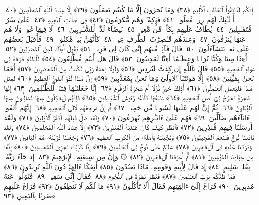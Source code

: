  إِنَّكُم لَذَآئِقُوا۟ ٱلعَذَابِ ٱلأَلِيمِ ﴿٣٨﴾
 وَمَا تُجزَونَ إِلَّا مَا كُنتُم تَعمَلُونَ ﴿٣٩﴾
 إِلَّا عِبَادَ ٱللَّهِ ٱلمُخلَصِينَ ﴿٤٠﴾
 أُو۟لَـٰٓئِكَ لَهُم رِزقٌۭ مَّعلُومٌۭ ﴿٤١﴾
 فَوَٟكِهُ ۖ وَهُم مُّكرَمُونَ ﴿٤٢﴾
 فِى جَنَّـٰتِ ٱلنَّعِيمِ ﴿٤٣﴾
 عَلَىٰ سُرُرٍۢ مُّتَقَـٰبِلِينَ ﴿٤٤﴾
 يُطَافُ عَلَيهِم بِكَأسٍۢ مِّن مَّعِينٍۭ ﴿٤٥﴾
 بَيضَآءَ لَذَّةٍۢ لِّلشَّـٰرِبِينَ ﴿٤٦﴾
 لَا فِيهَا غَولٌۭ وَلَا هُم عَنهَا يُنزَفُونَ ﴿٤٧﴾
 وَعِندَهُم قَـٰصِرَٰتُ ٱلطَّرفِ عِينٌۭ ﴿٤٨﴾
 كَأَنَّهُنَّ بَيضٌۭ مَّكنُونٌۭ ﴿٤٩﴾
 فَأَقبَلَ بَعضُهُم عَلَىٰ بَعضٍۢ يَتَسَآءَلُونَ ﴿٥٠﴾
 قَالَ قَآئِلٌۭ مِّنهُم إِنِّى كَانَ لِى قَرِينٌۭ ﴿٥١﴾
 يَقُولُ أَءِنَّكَ لَمِنَ ٱلمُصَدِّقِينَ ﴿٥٢﴾
 أَءِذَا مِتنَا وَكُنَّا تُرَابًۭا وَعِظَـٰمًا أَءِنَّا لَمَدِينُونَ ﴿٥٣﴾
 قَالَ هَل أَنتُم مُّطَّلِعُونَ ﴿٥٤﴾
 فَٱطَّلَعَ فَرَءَاهُ فِى سَوَآءِ ٱلجَحِيمِ ﴿٥٥﴾
 قَالَ تَٱللَّهِ إِن كِدتَّ لَتُردِينِ ﴿٥٦﴾
 وَلَولَا نِعمَةُ رَبِّى لَكُنتُ مِنَ ٱلمُحضَرِينَ ﴿٥٧﴾
 أَفَمَا نَحنُ بِمَيِّتِينَ ﴿٥٨﴾
 إِلَّا مَوتَتَنَا ٱلأُولَىٰ وَمَا نَحنُ بِمُعَذَّبِينَ ﴿٥٩﴾
 إِنَّ هَـٰذَا لَهُوَ ٱلفَوزُ ٱلعَظِيمُ ﴿٦٠﴾
 لِمِثلِ هَـٰذَا فَليَعمَلِ ٱلعَـٰمِلُونَ ﴿٦١﴾
 أَذَٟلِكَ خَيرٌۭ نُّزُلًا أَم شَجَرَةُ ٱلزَّقُّومِ ﴿٦٢﴾
 إِنَّا جَعَلنَـٰهَا فِتنَةًۭ لِّلظَّـٰلِمِينَ ﴿٦٣﴾
 إِنَّهَا شَجَرَةٌۭ تَخرُجُ فِىٓ أَصلِ ٱلجَحِيمِ ﴿٦٤﴾
 طَلعُهَا كَأَنَّهُۥ رُءُوسُ ٱلشَّيَـٰطِينِ ﴿٦٥﴾
 فَإِنَّهُم لَءَاكِلُونَ مِنهَا فَمَالِـُٔونَ مِنهَا ٱلبُطُونَ ﴿٦٦﴾
 ثُمَّ إِنَّ لَهُم عَلَيهَا لَشَوبًۭا مِّن حَمِيمٍۢ ﴿٦٧﴾
 ثُمَّ إِنَّ مَرجِعَهُم لَإِلَى ٱلجَحِيمِ ﴿٦٨﴾
 إِنَّهُم أَلفَوا۟ ءَابَآءَهُم ضَآلِّينَ ﴿٦٩﴾
 فَهُم عَلَىٰٓ ءَاثَـٰرِهِم يُهرَعُونَ ﴿٧٠﴾
 وَلَقَد ضَلَّ قَبلَهُم أَكثَرُ ٱلأَوَّلِينَ ﴿٧١﴾
 وَلَقَد أَرسَلنَا فِيهِم مُّنذِرِينَ ﴿٧٢﴾
 فَٱنظُر كَيفَ كَانَ عَـٰقِبَةُ ٱلمُنذَرِينَ ﴿٧٣﴾
 إِلَّا عِبَادَ ٱللَّهِ ٱلمُخلَصِينَ ﴿٧٤﴾
 وَلَقَد نَادَىٰنَا نُوحٌۭ فَلَنِعمَ ٱلمُجِيبُونَ ﴿٧٥﴾
 وَنَجَّينَـٰهُ وَأَهلَهُۥ مِنَ ٱلكَربِ ٱلعَظِيمِ ﴿٧٦﴾
 وَجَعَلنَا ذُرِّيَّتَهُۥ هُمُ ٱلبَاقِينَ ﴿٧٧﴾
 وَتَرَكنَا عَلَيهِ فِى ٱلءَاخِرِينَ ﴿٧٨﴾
 سَلَـٰمٌ عَلَىٰ نُوحٍۢ فِى ٱلعَـٰلَمِينَ ﴿٧٩﴾
 إِنَّا كَذَٟلِكَ نَجزِى ٱلمُحسِنِينَ ﴿٨٠﴾
 إِنَّهُۥ مِن عِبَادِنَا ٱلمُؤمِنِينَ ﴿٨١﴾
 ثُمَّ أَغرَقنَا ٱلءَاخَرِينَ ﴿٨٢﴾
 ۞ وَإِنَّ مِن شِيعَتِهِۦ لَإِبرَٰهِيمَ ﴿٨٣﴾
 إِذ جَآءَ رَبَّهُۥ بِقَلبٍۢ سَلِيمٍ ﴿٨٤﴾
 إِذ قَالَ لِأَبِيهِ وَقَومِهِۦ مَاذَا تَعبُدُونَ ﴿٨٥﴾
 أَئِفكًا ءَالِهَةًۭ دُونَ ٱللَّهِ تُرِيدُونَ ﴿٨٦﴾
 فَمَا ظَنُّكُم بِرَبِّ ٱلعَـٰلَمِينَ ﴿٨٧﴾
 فَنَظَرَ نَظرَةًۭ فِى ٱلنُّجُومِ ﴿٨٨﴾
 فَقَالَ إِنِّى سَقِيمٌۭ ﴿٨٩﴾
 فَتَوَلَّوا۟ عَنهُ مُدبِرِينَ ﴿٩٠﴾
 فَرَاغَ إِلَىٰٓ ءَالِهَتِهِم فَقَالَ أَلَا تَأكُلُونَ ﴿٩١﴾
 مَا لَكُم لَا تَنطِقُونَ ﴿٩٢﴾
 فَرَاغَ عَلَيهِم ضَربًۢا بِٱليَمِينِ ﴿٩٣﴾

